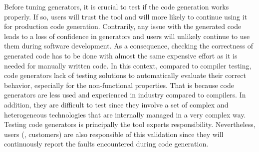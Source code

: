 
Before tuning generators, it is crucial to test if the code generation works properly. If so, users will trust the tool and will more likely to continue using it for production code generation. Contrarily, any issue with the generated code leads to a loss of confidence in generators and users will unlikely continue to use them during software development. As a consequence, checking the correctness of generated code has to be done with almost the same expensive effort as it is needed for manually written code.
In this context, compared to compiler testing\cite{yang2011finding,le2014compiler}, code generators lack of testing solutions to automatically evaluate their correct behavior, especially for the non-functional properties.
That is because code generators are less used and experienced in industry compared to compilers. In addition, they are difficult to test since they involve a set of complex and heterogeneous technologies that are internally managed in a very complex way\cite{guana2015developers,guana2014chaintracker}.
Testing code generators is principally the tool experts responsibility. Nevertheless, users (\eg, customers) are also responsible of this validation since they will continuously report the faults encountered during code generation. 
